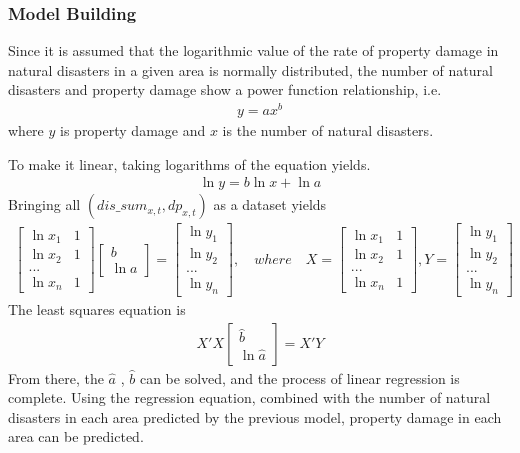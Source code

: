 \documentclass[12pt]{article}  %
\begin{document}
\subsubsection{Model Building}
Since it is assumed that the logarithmic value of the rate of property damage in natural disasters in a given area is normally distributed, the number of natural disasters and property damage show a power function relationship, i.e.
\begin{align*}
    y=ax^b
\end{align*}
where $y$ is property damage and $x$ is the number of natural disasters.

To make it linear, taking logarithms of the equation yields.
\begin{align*}
    \ln y=b\ln x +  \ln a
\end{align*}
Bringing all $(dis\_sum_{x,t},dp_{x,t})$ as a dataset yields
\begin{align*}
    \begin{bmatrix}
\ln x_1 & 1 \\
\ln x_2 & 1 \\
... \\
\ln x_n & 1 
\end{bmatrix}
\begin{bmatrix}
b \\
\ln a
\end{bmatrix}
=
\begin{bmatrix}
\ln y_1 \\
\ln y_2 \\
... \\
\ln y_n
\end{bmatrix},
\quad where \quad 
X=
\begin{bmatrix}
\ln x_1 & 1 \\
\ln x_2 & 1 \\
... \\
\ln x_n & 1 
\end{bmatrix},
Y=\begin{bmatrix}
\ln y_1 \\
\ln y_2 \\
... \\
\ln y_n
\end{bmatrix}
\end{align*}
The least squares equation is
\begin{align*}
    X'X
\begin{bmatrix}
\widehat{b}  \\
\ln \widehat{a} 
\end{bmatrix}
=
X'Y
\end{align*}
From there, the $\widehat{a}$ , $\widehat{b}$ can be solved, and the process of linear regression is complete. Using the regression equation, combined with the number of natural disasters in each area predicted by the previous model, property damage in each area can be predicted.
\end{document}
